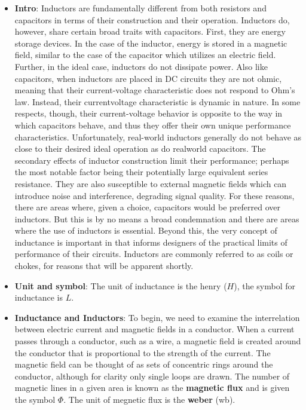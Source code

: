 \documentclass{report}
\begin{document}
    \pagebreak 
    \begin{itemize}
        \item \textbf{Intro}: Inductors are fundamentally different from both resistors and capacitors in terms of their construction and their operation. Inductors do, however, share certain broad traits with capacitors. First, they are energy storage devices. In the case of the inductor, energy is stored in a magnetic field, similar to the case of the capacitor which utilizes an electric field. Further, in the ideal case, inductors do not dissipate power. Also like capacitors, when inductors are placed in DC circuits they are not ohmic, meaning that their current-voltage characteristic does not respond to Ohm's law. Instead, their currentvoltage characteristic is dynamic in nature. In some respects, though, their current-voltage behavior is opposite to the way in which capacitors behave, and thus they offer their own unique performance characteristics.
            \bigbreak \noindent 
            Unfortunately, real-world inductors generally do not behave as close to their desired ideal operation as do realworld capacitors. The secondary effects of inductor construction limit their performance; perhaps the most notable factor being their potentially large equivalent series resistance. They are also susceptible to external magnetic fields which can introduce noise and interference, degrading signal quality. For these reasons, there are areas where, given a choice, capacitors would be preferred over inductors. But this is by no means a broad condemnation and there are areas where the use of inductors is essential. Beyond this, the very concept of inductance is important in that informs designers of the practical limits of performance of their circuits.
            \bigbreak \noindent 
            Inductors are commonly referred to as coils or chokes, for reasons that will be apparent shortly.
        \item \textbf{Unit and symbol}: The unit of inductance is the henry ($H$), the symbol for inductance is $L$.
        \item \textbf{Inductance and Inductors}: To begin, we need to examine the interrelation between electric current and magnetic fields in a conductor. When a current passes through a conductor, such as a wire, a magnetic field is created around the conductor that is proportional to the strength of the current.
            \bigbreak \noindent 
            \bigbreak \noindent 
            The magnetic field can be thought of as sets of concentric rings around the conductor, although for clarity only single loops are drawn. The number of magnetic lines in a given area is known as the \textbf{magnetic flux} and is given the symbol $\Phi$. The unit of megnetic flux is the \textbf{weber} (wb).

\end{itemize}
\end{document}
